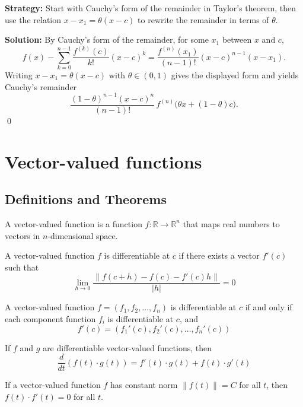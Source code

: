 \noindent\textbf{Strategy:} Start with Cauchy's form of the remainder in Taylor's theorem, then use the relation \( x - x_1 = \theta(x - c) \) to rewrite the remainder in terms of \( \theta \).

\bigskip\noindent\textbf{Solution:}
By Cauchy's form of the remainder, for some $x_1$ between $x$ and $c$,
\[f(x)-\sum_{k=0}^{n-1}\frac{f^{(k)}(c)}{k!}(x-c)^k=\frac{f^{(n)}(x_1)}{(n-1)!}(x-c)^{n-1}(x-x_1).\]
Writing $x-x_1=\theta(x-c)$ with $\theta\in(0,1)$ gives the displayed form and yields Cauchy's remainder
\[\frac{(1-\theta)^{n-1}(x-c)^n}{(n-1)!}\,f^{(n)}\big(\theta x+(1-\theta)c\big).\]\qed

\section{Vector-valued functions}

\subsection*{Definitions and Theorems}

\begin{definition}
A vector-valued function is a function $f: \mathbb{R} \to \mathbb{R}^n$ that maps real numbers to vectors in $n$-dimensional space.
\end{definition}

\begin{definition}
A vector-valued function $f$ is differentiable at $c$ if there exists a vector $f'(c)$ such that
\[ \lim_{h \to 0} \frac{\|f(c + h) - f(c) - f'(c)h\|}{|h|} = 0 \]
\end{definition}

\begin{theorem}
A vector-valued function $f = (f_1, f_2, \ldots, f_n)$ is differentiable at $c$ if and only if each component function $f_i$ is differentiable at $c$, and
\[ f'(c) = (f_1'(c), f_2'(c), \ldots, f_n'(c)) \]
\end{theorem}

\begin{theorem}
If $f$ and $g$ are differentiable vector-valued functions, then
\[ \frac{d}{dt}(f(t) \cdot g(t)) = f'(t) \cdot g(t) + f(t) \cdot g'(t) \]
\end{theorem}

\begin{theorem}
If a vector-valued function $f$ has constant norm $\|f(t)\| = C$ for all $t$, then $f(t) \cdot f'(t) = 0$ for all $t$.
\end{theorem}


